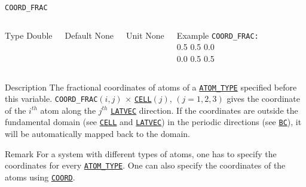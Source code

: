 \begin{frame}[allowframebreaks]{\texttt{COORD\_FRAC}} \label{COORD_FRAC}
\vspace*{-12pt}
\begin{columns}
\begin{block}{Type}
Double
\end{block}

\begin{block}{Default}
None
\end{block}

\begin{block}{Unit}
None
\end{block}

\begin{block}{Example}
\texttt{COORD\_FRAC: \\}
0.5 0.5 0.0 \\
0.0 0.5 0.5
\end{block}
\end{columns}

\begin{block}{Description}
The fractional coordinates of atoms of a \hyperlink{ATOM_TYPE}{\texttt{ATOM\_TYPE}} specified before this variable. \texttt{COORD\_FRAC}$(i,j)$ $\times$ \hyperlink{CELL}{\texttt{CELL}}$(j)$, $(j = 1,2,3)$ gives the coordinate of the $i^{th}$ atom along the $j^{th}$ \hyperlink{LATVEC}{\texttt{LATVEC}} direction. If the coordinates are outside the fundamental domain (see \hyperlink{CELL}{\texttt{CELL}} and \hyperlink{LATVEC}{\texttt{LATVEC}}) in the periodic directions (see \hyperlink{BC}{\texttt{BC}}), it will be automatically mapped back to the domain.
\end{block}

\begin{block}{Remark}
For a system with different types of atoms, one has to specify the coordinates for every \hyperlink{ATOM_TYPE}{\texttt{ATOM\_TYPE}}. One can also specify the coordinates of the atoms using \hyperlink{COORD}{\texttt{COORD}}.
\end{block}

\end{frame}



